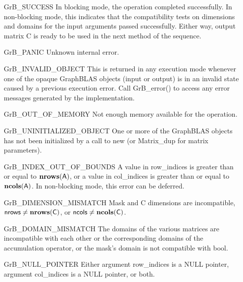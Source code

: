 \begin{itemize}[leftmargin=2.1in]
    \item[{\sf GrB\_SUCCESS}]         In blocking mode, the operation completed
    successfully. In non-blocking mode, this indicates that the compatibility 
    tests on dimensions and domains for the input arguments passed successfully. 
    Either way, output matrix {\sf C} is ready to be used in the next method of
    the sequence.

    \item[{\sf GrB\_PANIC}]           Unknown internal error.

    \item[{\sf GrB\_INVALID\_OBJECT}] This is returned in any execution mode 
    whenever one of the opaque GraphBLAS objects (input or output) is in an invalid 
    state caused by a previous execution error.  Call {\sf GrB\_error()} to access 
    any error messages generated by the implementation.

    \item[{\sf GrB\_OUT\_OF\_MEMORY}] Not enough memory available for the operation.

    \item[{\sf GrB\_UNINITIALIZED\_OBJECT}] One or more of the GraphBLAS objects 
    has not been initialized by a call to {\sf new} (or {\sf Matrix\_dup} for matrix
    parameters).

    \item[{\sf GrB\_INDEX\_OUT\_OF\_BOUNDS}]  A value in {\sf row\_indices} 
    is greater than or equal to $\bold{nrows}({\sf A})$, or a value in 
    {\sf col\_indices} is greater than or equal to $\bold{ncols}({\sf A})$.  In 
    non-blocking mode, this error can be deferred.

    \item[{\sf GrB\_DIMENSION\_MISMATCH}] {\sf Mask} and {\sf C}
    dimensions are incompatible, ${\sf nrows} \neq \bold{nrows}({\sf C})$, or 
    ${\sf ncols} \neq \bold{ncols}({\sf C})$.

    \item[{\sf GrB\_DOMAIN\_MISMATCH}]    The domains of the various matrices are
    incompatible with each other or the corresponding domains of the 
    accumulation operator, or the mask's domain is not compatible with {\sf bool}.

    \item[{\sf GrB\_NULL\_POINTER}] Either argument {\sf row\_indices} is a {\sf NULL} pointer,
	argument {\sf col\_indices} is a {\sf NULL} pointer, or both.
\end{itemize}

